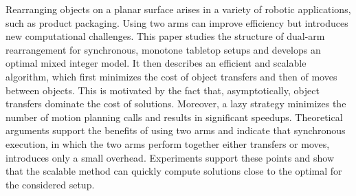 Rearranging objects on a planar surface arises in a variety of
robotic applications, such as product packaging.  Using two arms can improve
efficiency but introduces new computational challenges. This paper
studies the structure of dual-arm rearrangement for synchronous,
monotone tabletop setups and develops an optimal mixed integer model. It then
describes an efficient and scalable algorithm, which first minimizes
the cost of object transfers and then of moves between objects.
This is motivated by the fact that, asymptotically, object transfers
dominate the cost of solutions. Moreover, a lazy strategy minimizes
the number of motion planning calls and results in significant
speedups.  Theoretical arguments support the benefits of using two
arms and indicate that synchronous execution, in which the two arms perform together either transfers or moves, introduces only a small
overhead.  Experiments support these points and show that the
scalable method can quickly compute solutions close to the optimal for
the considered setup.

